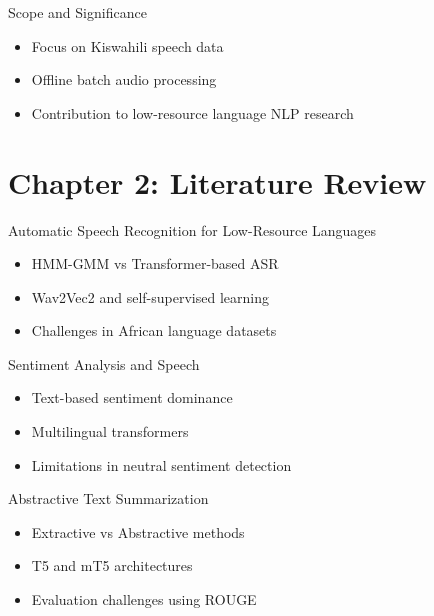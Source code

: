 \documentclass{beamer}
\begin{document}
\begin{frame}{Scope and Significance}
\begin{itemize}
    \item Focus on Kiswahili speech data
    \item Offline batch audio processing
    \item Contribution to low-resource language NLP research
\end{itemize}
\end{frame}

\section{Chapter 2: Literature Review}

\begin{frame}{Automatic Speech Recognition for Low-Resource Languages}
\begin{itemize}
    \item HMM-GMM vs Transformer-based ASR
    \item Wav2Vec2 and self-supervised learning
    \item Challenges in African language datasets
\end{itemize}
\end{frame}

\begin{frame}{Sentiment Analysis and Speech}
\begin{itemize}
    \item Text-based sentiment dominance
    \item Multilingual transformers
    \item Limitations in neutral sentiment detection
\end{itemize}
\end{frame}

\begin{frame}{Abstractive Text Summarization}
\begin{itemize}
    \item Extractive vs Abstractive methods
    \item T5 and mT5 architectures
    \item Evaluation challenges using ROUGE
\end{itemize}
\end{frame}

\end{document}
